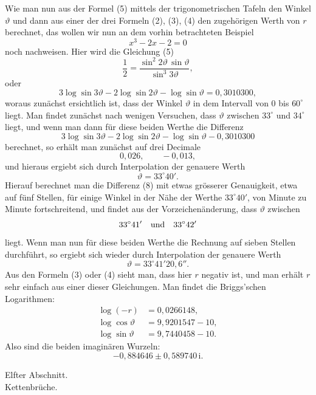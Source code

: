 \documentclass[11pt]{article}
\providecommand{\ii}{\mathrm{i}}
\begin{document}
Wie man nun aus der Formel (5) mittels der trigonometrischen Tafeln den Winkel $\vartheta$ und dann aus einer der drei Formeln (2), (3), (4) den zugehörigen Werth von $r$ berechnet, das wollen wir nun an dem vorhin betrachteten Beispiel
\[
        x^3-2x-2=0
\]
noch nachweisen. Hier wird die Gleichung (5)
\begin{equation}
        \frac12=\frac{\sin^2 2\vartheta\,\sin\vartheta}
                       {\sin^3 3\vartheta},
\tag{6}
\end{equation}
oder
\begin{equation}
        3\log\sin3\vartheta-2\log\sin2\vartheta-\log\sin\vartheta=0{,}3010300,
\tag{7}
\end{equation}
woraus zunächst ersichtlich ist, dass der Winkel $\vartheta$ in dem Intervall von $0$ bis $60^\circ$ liegt. Man findet zunächst nach wenigen Versuchen, dass $\vartheta$ zwischen $33^\circ$ und $34^\circ$ liegt, und wenn man dann für diese beiden Werthe die Differenz
\begin{equation}
        3\log\sin3\vartheta-2\log\sin2\vartheta-\log\sin\vartheta-0{,}3010300
\tag{8}
\end{equation}
berechnet, so erhält man zunächst auf drei Decimale
\[
        0{,}026,\qquad -0{,}013,
\]
und hieraus ergiebt sich durch Interpolation der genauere Werth
\[
        \vartheta=33^\circ40'.
\]
Hierauf berechnet man die Differenz (8) mit etwas grösserer Genauigkeit, etwa auf fünf Stellen, für einige Winkel in der Nähe der Werthe $33^\circ40'$, von Minute zu Minute fortschreitend, und findet aus der Vorzeichenänderung, dass $\vartheta$ zwischen
\[
        33^\circ41'\quad\hbox{und}\quad 33^\circ42'
\]
liegt. Wenn man nun für diese beiden Werthe die Rechnung auf sieben Stellen durchführt, so ergiebt sich wieder durch Interpolation der genauere Werth
\[
        \vartheta=33^\circ41'20{,}6''.
\]
Aus den Formeln (3) oder (4) sieht man, dass hier $r$ negativ ist, und man erhält $r$ sehr einfach aus einer dieser Gleichungen. Man findet die Briggs'schen Logarithmen:
\[
\begin{aligned}
\log(-r)&=0{,}0266148,\\
\log\cos\vartheta&=9{,}9201547-10,\\
\log\sin\vartheta&=9{,}7440458-10.
\end{aligned}
\]
Also sind die beiden imaginären Wurzeln:
\[
        -0{,}884646\pm0{,}589740\,\ii.
\]

\begin{center}
{\Large Elfter Abschnitt.}\\[0.6em]
{\large Kettenbrüche.}
\end{center}
\end{document}

